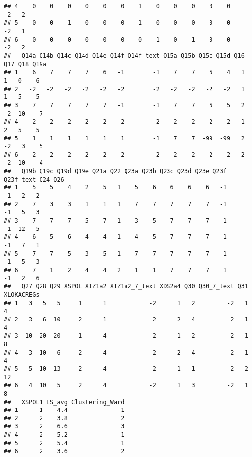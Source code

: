 \documentclass[
]{article}
\newenvironment{Shaded}{\begin{snugshade}}{\end{snugshade}}
\newcommand{\AttributeTok}[1]{\textcolor[rgb]{0.77,0.63,0.00}{#1}}
\newcommand{\FunctionTok}[1]{\textcolor[rgb]{0.00,0.00,0.00}{#1}}
\newcommand{\NormalTok}[1]{#1}
\newcommand{\OtherTok}[1]{\textcolor[rgb]{0.56,0.35,0.01}{#1}}
\newcommand{\SpecialCharTok}[1]{\textcolor[rgb]{0.00,0.00,0.00}{#1}}
\begin{document}
\begin{verbatim}
## 4    0    0    0    0    0    0    1    0    0    0    0    0        -2   2
## 5    0    0    1    0    0    0    1    0    0    0    0    0        -2   1
## 6    0    0    0    0    0    0    0    1    0    1    0    0        -2   2
##   Q14a Q14b Q14c Q14d Q14e Q14f Q14f_text Q15a Q15b Q15c Q15d Q16 Q17 Q18 Q19a
## 1    6    7    7    7    6   -1        -1    7    7    6    4   1   1   0    6
## 2   -2   -2   -2   -2   -2   -2        -2   -2   -2   -2   -2   1   1   5    5
## 3    7    7    7    7    7   -1        -1    7    7    6    5   2  -2  10    7
## 4   -2   -2   -2   -2   -2   -2        -2   -2   -2   -2   -2   1   2   5    5
## 5    1    1    1    1    1    1        -1    7    7  -99  -99   2  -2   3    5
## 6   -2   -2   -2   -2   -2   -2        -2   -2   -2   -2   -2   2  -2  10    4
##   Q19b Q19c Q19d Q19e Q21a Q22 Q23a Q23b Q23c Q23d Q23e Q23f Q23f_text Q24 Q26
## 1    5    5    4    2    5   1    5    6    6    6    6   -1        -1   2   2
## 2    7    3    3    1    1   1    7    7    7    7    7   -1        -1   5   3
## 3    7    7    7    5    7   1    3    5    7    7    7   -1        -1  12   5
## 4    6    5    6    4    4   1    4    5    7    7    7   -1        -1   7   1
## 5    7    7    5    3    5   1    7    7    7    7    7   -1        -1   5   3
## 6    7    1    2    4    4   2    1    1    7    7    7    1        -1   2   6
##   Q27 Q28 Q29 XSPOL XIZ1a2 XIZ1a2_7_text XDS2a4 Q30 Q30_7_text Q31 XLOKACREGs
## 1   3   5   5     1      1            -2      1   2         -2   1          4
## 2   3   6  10     2      1            -2      2   4         -2   1          4
## 3  10  20  20     1      4            -2      1   2         -2   1          8
## 4   3  10   6     2      4            -2      2   4         -2   1          4
## 5   5  10  13     2      4            -2      1   1         -2   2         12
## 6   4  10   5     2      4            -2      1   3         -2   1          8
##   XSPOL1 LS_avg Clustering_Ward
## 1      1    4.4               1
## 2      2    3.8               2
## 3      2    6.6               3
## 4      2    5.2               1
## 5      2    5.4               1
## 6      2    3.6               2
\end{verbatim}

\begin{Shaded}
\end{Shaded}
\end{document}
